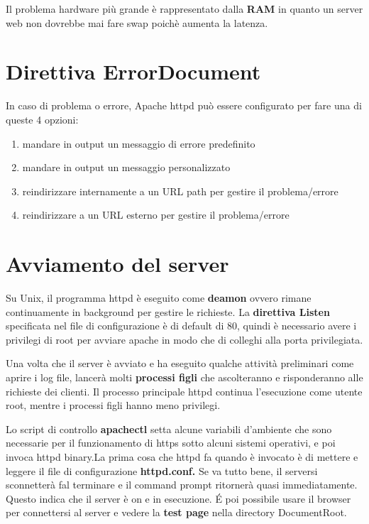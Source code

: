 Il problema hardware più grande è rappresentato dalla \textbf{RAM} in quanto un server web non dovrebbe mai fare swap poichè aumenta la latenza.

\section{Direttiva ErrorDocument}
In caso di problema o errore, Apache httpd può essere configurato per fare una di queste 4 opzioni:
\begin{enumerate}
    \item mandare in output un messaggio di errore predefinito
    \item mandare in output un messaggio personalizzato
    \item reindirizzare internamente a un URL path per gestire il problema/errore
    \item reindirizzare a un URL esterno per gestire il problema/errore
\end{enumerate}


\section{Avviamento del server}
Su Unix, il programma httpd è eseguito come \textbf{deamon} ovvero rimane continuamente in background per gestire le richieste. La \textbf{direttiva Listen} specificata nel file di configurazione è di default di 80, quindi è necessario avere i privilegi di root per avviare apache in modo che di colleghi alla porta privilegiata. 

Una volta che il server è avviato e ha eseguito qualche attività preliminari come aprire i log file, lancerà molti \textbf{processi figli} che ascolteranno e risponderanno alle richieste dei clienti. Il processo principale httpd continua l'esecuzione come utente root, mentre i processi figli hanno meno privilegi.

Lo script di controllo \textbf{apachectl} setta alcune variabili d'ambiente che sono necessarie per il funzionamento di https sotto alcuni sistemi operativi, e poi invoca httpd binary.La prima cosa che httpd fa quando è invocato è di mettere e leggere il file di configurazione \textbf{httpd.conf.} Se va tutto bene, il serversi sconnetterà fal terminare e il command prompt ritornerà quasi immediatamente. Questo indica che il server è on e in esecuzione. \'E poi possibile usare il browser per connettersi al server e vedere la \textbf{test page} nella directory DocumentRoot.









